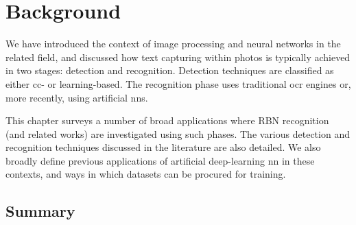 \chapter{Background}
\label{ch:background}


We have introduced the context of image processing and neural networks in the related field, and discussed how text capturing within photos is typically achieved in two stages: detection and recognition. Detection techniques are classified as either \gls{cc}- or learning-based. The recognition phase uses traditional \gls{ocr} engines or, more recently, using artificial \glspl{nn}. 

This chapter surveys a number of broad applications where RBN recognition (and related works) are investigated using such phases. The various detection and recognition techniques discussed in the literature are also detailed. We also broadly define previous applications of artificial deep-learning \gls{nn} in these contexts, and ways in which datasets can be procured for training.





\section*{Summary}

